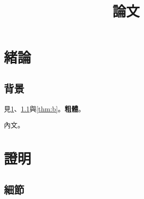 \documentclass[lang=zh, secnum=zh, fontsize=14pt, text=palatino,
  cjk-serif=FandolSong-Regular.otf, cjk-serif-bold=FandolSong-Bold.otf]{akizumi-book}
\title{論文}
\begin{document}
\maketitle
\tableofcontents
\chapter{緒論}\label{ch:a}
\section{背景}\label{sec:a}
見\cref{ch:a}、\cref{sec:a}與\cref{thm:b}。\textbf{粗體}。
\begin{theorem}\label{thm:b} 內文。\end{theorem}
\ifdim\parindent=0pt \else\ERROR\fi  %
\makeatletter\ifdim\f@size pt=14pt \else\ERROR\fi\makeatother
\appendix
\chapter{證明}
\section{細節}
\end{document}
